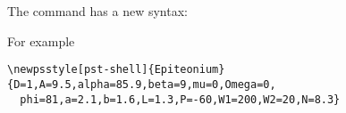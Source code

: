 \documentclass[11pt,english,BCOR=10mm,DIV=12,bibliography=totoc,parskip=false,headings=small,
    headinclude=false,footinclude=false,twoside]{pst-doc}
\begin{document}
The command  has a new syntax:

\begin{BDef}
\end{BDef}

For example

\begin{verbatim}
\newpsstyle[pst-shell]{Epiteonium}{D=1,A=9.5,alpha=85.9,beta=9,mu=0,Omega=0,
  phi=81,a=2.1,b=1.6,L=1.3,P=-60,W1=200,W2=20,N=8.3}
\end{verbatim}


\clearpage
\nocite{*}
\printbibliography

\printindex
\end{document}
